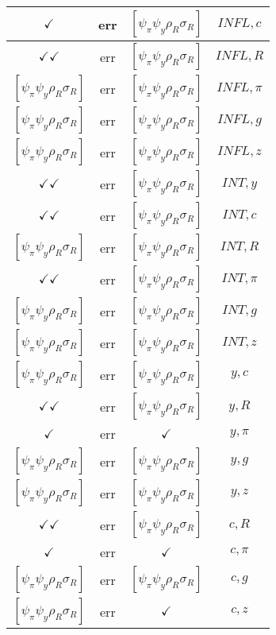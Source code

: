 \documentclass[a4paper,10pt]{article}
\begin{document}
\begin{longtable}{|c|c|c|c|}
\hline
$\checkmark$ & err & $[\psi_\pi \psi_y \rho_R \sigma_R ]$ & ${INFL},{c}$ \\
\hline
$\checkmark\checkmark$ & err & $[\psi_\pi \psi_y \rho_R \sigma_R ]$ & ${INFL},{R}$ \\
\hline
$[\psi_\pi \psi_y \rho_R \sigma_R ]$ & err & $[\psi_\pi \psi_y \rho_R \sigma_R ]$ & ${INFL},{\pi}$ \\
\hline
$[\psi_\pi \psi_y \rho_R \sigma_R ]$ & err & $[\psi_\pi \psi_y \rho_R \sigma_R ]$ & ${INFL},{g}$ \\
\hline
$[\psi_\pi \psi_y \rho_R \sigma_R ]$ & err & $[\psi_\pi \psi_y \rho_R \sigma_R ]$ & ${INFL},{z}$ \\
\hline
$\checkmark\checkmark$ & err & $[\psi_\pi \psi_y \rho_R \sigma_R ]$ & ${INT},{y}$ \\
\hline
$\checkmark\checkmark$ & err & $[\psi_\pi \psi_y \rho_R \sigma_R ]$ & ${INT},{c}$ \\
\hline
$[\psi_\pi \psi_y \rho_R \sigma_R ]$ & err & $[\psi_\pi \psi_y \rho_R \sigma_R ]$ & ${INT},{R}$ \\
\hline
$\checkmark\checkmark$ & err & $[\psi_\pi \psi_y \rho_R \sigma_R ]$ & ${INT},{\pi}$ \\
\hline
$[\psi_\pi \psi_y \rho_R \sigma_R ]$ & err & $[\psi_\pi \psi_y \rho_R \sigma_R ]$ & ${INT},{g}$ \\
\hline
$[\psi_\pi \psi_y \rho_R \sigma_R ]$ & err & $[\psi_\pi \psi_y \rho_R \sigma_R ]$ & ${INT},{z}$ \\
\hline
$[\psi_\pi \psi_y \rho_R \sigma_R ]$ & err & $[\psi_\pi \psi_y \rho_R \sigma_R ]$ & ${y},{c}$ \\
\hline
$\checkmark\checkmark$ & err & $[\psi_\pi \psi_y \rho_R \sigma_R ]$ & ${y},{R}$ \\
\hline
$\checkmark$ & err & $\checkmark$ & ${y},{\pi}$ \\
\hline
$[\psi_\pi \psi_y \rho_R \sigma_R ]$ & err & $[\psi_\pi \psi_y \rho_R \sigma_R ]$ & ${y},{g}$ \\
\hline
$[\psi_\pi \psi_y \rho_R \sigma_R ]$ & err & $[\psi_\pi \psi_y \rho_R \sigma_R ]$ & ${y},{z}$ \\
\hline
$\checkmark\checkmark$ & err & $[\psi_\pi \psi_y \rho_R \sigma_R ]$ & ${c},{R}$ \\
\hline
$\checkmark$ & err & $\checkmark$ & ${c},{\pi}$ \\
\hline
$[\psi_\pi \psi_y \rho_R \sigma_R ]$ & err & $[\psi_\pi \psi_y \rho_R \sigma_R ]$ & ${c},{g}$ \\
\hline
$[\psi_\pi \psi_y \rho_R \sigma_R ]$ & err & $\checkmark$ & ${c},{z}$ \\

\end{longtable}
\end{document}
